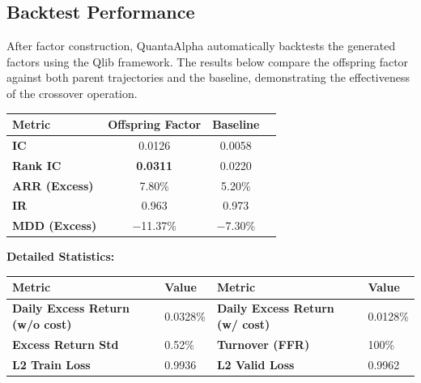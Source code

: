 \subsection{Backtest Performance}

After factor construction, QuantaAlpha automatically backtests the generated factors using the Qlib framework. The results below compare the offspring factor against both parent trajectories and the baseline, demonstrating the effectiveness of the crossover operation.

\begin{tcolorbox}[
  colback=lightblue,
  colframe=darkblue,
  fonttitle=\bfseries,
  title={\faChartLine\ Backtest Metrics},
  arc=2mm,
  boxrule=0.5pt,
  breakable
]

\begin{center}
\begin{tabular}{@{}lccc@{}}
\toprule
\textbf{Metric} & \textbf{Offspring Factor} & \textbf{Baseline} \\
\midrule
\textbf{IC} & 0.0126 & 0.0058 \\
\textbf{Rank IC} & \textbf{0.0311} & 0.0220 \\
\midrule
\textbf{ARR (Excess)} & 7.80\% & 5.20\% \\
\textbf{IR} & 0.963 & 0.973 \\
\textbf{MDD (Excess)} & $-$11.37\% & $-$7.30\% \\
\bottomrule
\end{tabular}
\end{center}

\vspace{0.3cm}

\textbf{Detailed Statistics:}
\begin{center}
\small
\begin{tabular}{@{}ll|ll@{}}
\toprule
\textbf{Metric} & \textbf{Value} & \textbf{Metric} & \textbf{Value} \\
\midrule
\textbf{Daily Excess Return (w/o cost)} & 0.0328\% & \textbf{Daily Excess Return (w/ cost)} & 0.0128\% \\
\textbf{Excess Return Std} & 0.52\% & \textbf{Turnover (FFR)} & 100\% \\
\textbf{L2 Train Loss} & 0.9936 & \textbf{L2 Valid Loss} & 0.9962 \\
\bottomrule
\end{tabular}
\end{center}

\end{tcolorbox}

